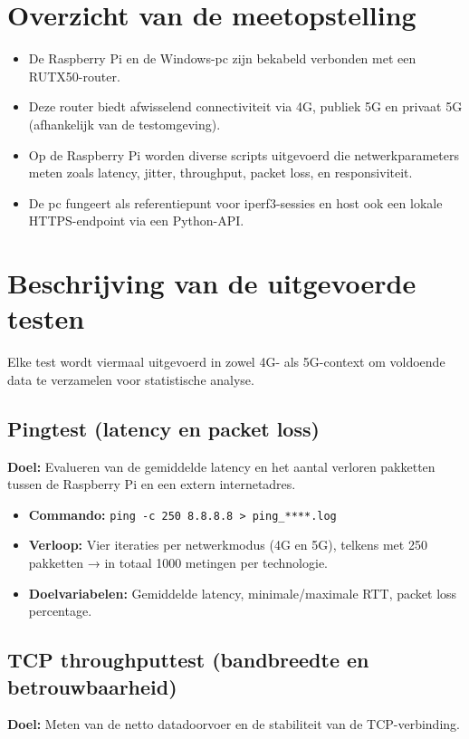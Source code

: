\section{Overzicht van de meetopstelling}

\begin{itemize}
    \item De Raspberry Pi en de Windows-pc zijn bekabeld verbonden met een RUTX50-router.
    \item Deze router biedt afwisselend connectiviteit via 4G, publiek 5G en privaat 5G (afhankelijk van de testomgeving).
    \item Op de Raspberry Pi worden diverse scripts uitgevoerd die netwerkparameters meten zoals latency, jitter, throughput, packet loss, en responsiviteit.
    \item De pc fungeert als referentiepunt voor iperf3-sessies en host ook een lokale HTTPS-endpoint via een Python-API.
\end{itemize}

\section{Beschrijving van de uitgevoerde testen}

Elke test wordt viermaal uitgevoerd in zowel 4G- als 5G-context om voldoende data te verzamelen voor statistische analyse.

\subsection{Pingtest (latency en packet loss)}
\textbf{Doel:} Evalueren van de gemiddelde latency en het aantal verloren pakketten tussen de Raspberry Pi en een extern internetadres.

\begin{itemize}
    \item \textbf{Commando:} \texttt{ping -c 250 8.8.8.8 > ping\_****.log}
    \item \textbf{Verloop:} Vier iteraties per netwerkmodus (4G en 5G), telkens met 250 pakketten → in totaal 1000 metingen per technologie.
    \item \textbf{Doelvariabelen:} Gemiddelde latency, minimale/maximale RTT, packet loss percentage.
\end{itemize}

\subsection{TCP throughputtest (bandbreedte en betrouwbaarheid)}
\textbf{Doel:} Meten van de netto datadoorvoer en de stabiliteit van de TCP-verbinding.

